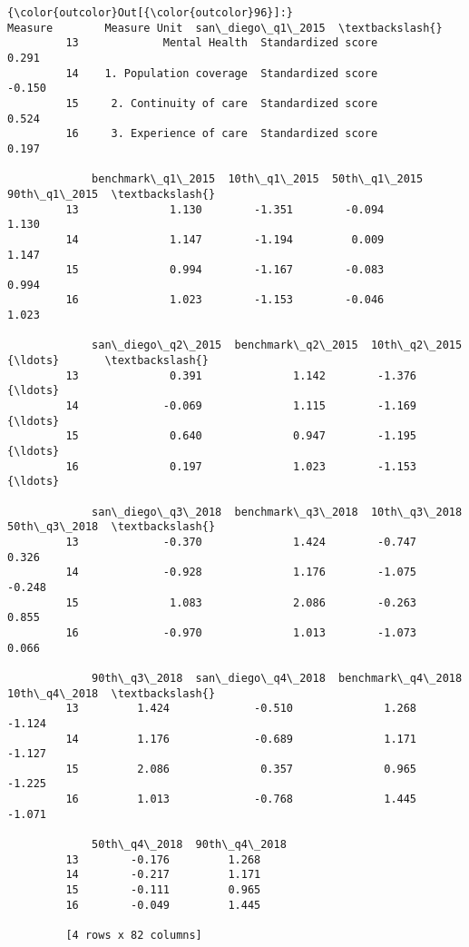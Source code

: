 \documentclass[11pt]{article}
\begin{document}
\begin{Verbatim}[commandchars=\\\{\}]
{\color{outcolor}Out[{\color{outcolor}96}]:}                      Measure        Measure Unit  san\_diego\_q1\_2015  \textbackslash{}
         13             Mental Health  Standardized score              0.291   
         14    1. Population coverage  Standardized score             -0.150   
         15     2. Continuity of care  Standardized score              0.524   
         16     3. Experience of care  Standardized score              0.197   
         
             benchmark\_q1\_2015  10th\_q1\_2015  50th\_q1\_2015  90th\_q1\_2015  \textbackslash{}
         13              1.130        -1.351        -0.094         1.130   
         14              1.147        -1.194         0.009         1.147   
         15              0.994        -1.167        -0.083         0.994   
         16              1.023        -1.153        -0.046         1.023   
         
             san\_diego\_q2\_2015  benchmark\_q2\_2015  10th\_q2\_2015      {\ldots}       \textbackslash{}
         13              0.391              1.142        -1.376      {\ldots}        
         14             -0.069              1.115        -1.169      {\ldots}        
         15              0.640              0.947        -1.195      {\ldots}        
         16              0.197              1.023        -1.153      {\ldots}        
         
             san\_diego\_q3\_2018  benchmark\_q3\_2018  10th\_q3\_2018  50th\_q3\_2018  \textbackslash{}
         13             -0.370              1.424        -0.747         0.326   
         14             -0.928              1.176        -1.075        -0.248   
         15              1.083              2.086        -0.263         0.855   
         16             -0.970              1.013        -1.073         0.066   
         
             90th\_q3\_2018  san\_diego\_q4\_2018  benchmark\_q4\_2018  10th\_q4\_2018  \textbackslash{}
         13         1.424             -0.510              1.268        -1.124   
         14         1.176             -0.689              1.171        -1.127   
         15         2.086              0.357              0.965        -1.225   
         16         1.013             -0.768              1.445        -1.071   
         
             50th\_q4\_2018  90th\_q4\_2018  
         13        -0.176         1.268  
         14        -0.217         1.171  
         15        -0.111         0.965  
         16        -0.049         1.445  
         
         [4 rows x 82 columns]
\end{Verbatim}
            
\end{document}
